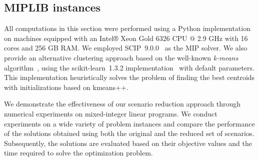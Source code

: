 \documentclass{article}
\begin{document}
\subsection{MIPLIB instances}\label{Section:MIPLIB}
All computations in this section were performed using a Python implementation on machines equipped with an Intel® Xeon Gold 6326 CPU @ 2.9 GHz with 16 cores and 256 GB RAM.
We employed SCIP~9.0.0~\cite{SCIP} as the MIP solver.  
We also provide an alternative clustering approach based on the well-known \emph{k-means} algorithm~\cite{kmeans_macqueen}, using the scikit-learn~1.3.2 implementation~\cite{scikit-learn} with default parameters.
This implementation heuristically solves the problem of finding the best centroids with initializations based on kmeans++.

We demonstrate the effectiveness of our scenario reduction approach through numerical experiments on mixed-integer linear programs.  
We conduct experiments on a wide variety of problem instances and compare the performance of the solutions obtained using both the original and the reduced set of scenarios.  
Subsequently, the solutions are evaluated based on their objective values and the time required to solve the optimization problem.
\end{document}
